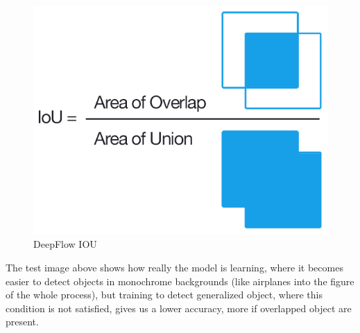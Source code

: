 \begin{figure}[ht]
\centering
\includegraphics[scale=0.2]{figures/IOU.png}
\caption{DeepFlow IOU}
\label{IOU_fig}
\end{figure}

The test image above shows how really the model is learning, where it becomes easier to detect objects in monochrome backgrounds (like airplanes into the figure of the
whole process), but training to detect generalized object, where this condition is not satisfied, gives us a lower accuracy, more if overlapped object are present.

